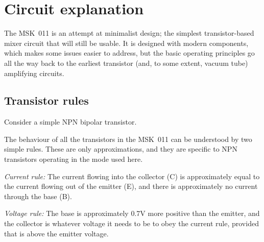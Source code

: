 
%
%
%
%
%
%

\chapter{Circuit explanation}

The MSK~011 is an attempt at minimalist design; the simplest
transistor-based mixer circuit that will still be usable.  It is designed
with modern components, which makes some issues easier to address, but the
basic operating principles go all the way back to the earliest transistor
(and, to some extent, vacuum tube) amplifying circuits.

\section{Transistor rules}

Consider a simple NPN bipolar transistor.

{\centering\par}

The behaviour of all the transistors in the MSK~011 can be understood by two
simple rules.  These are only approximations, and they are specific to NPN
transistors operating in the mode used here.

\emph{Current rule:}  The current flowing into the collector (C) is
approximately equal to the current flowing out of the emitter (E), and there
is approximately no current through the base (B).

\emph{Voltage rule:}  The base is approximately 0.7V more positive than the
emitter, and the collector is whatever voltage it needs to be to obey the
current rule, provided that is above the emitter voltage.

